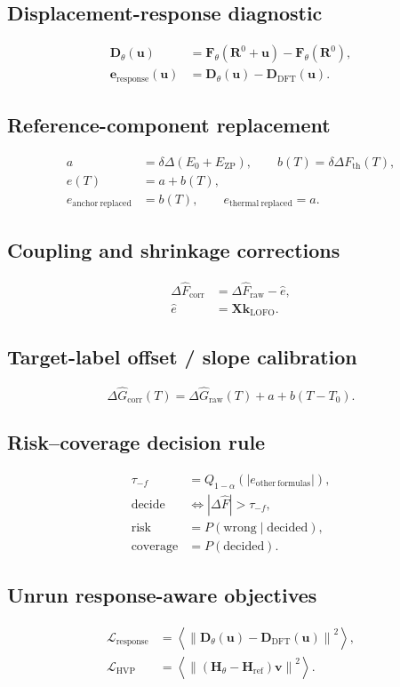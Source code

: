 \documentclass{article}
\begin{document}
\subsection*{Displacement-response diagnostic}
\[\begin{aligned}\mathbf D_\theta(\mathbf u)&=\mathbf F_\theta(\mathbf R^0+\mathbf u)-\mathbf F_\theta(\mathbf R^0),\\\mathbf e_{\mathrm{response}}(\mathbf u)&=\mathbf D_\theta(\mathbf u)-\mathbf D_{\mathrm{DFT}}(\mathbf u).\end{aligned}\]
\subsection*{Reference-component replacement}
\[\begin{aligned}a&=\delta\Delta(E_0+E_{\mathrm{ZP}}),\qquad b(T)=\delta\Delta F_{\mathrm{th}}(T),\\e(T)&=a+b(T),\\e_{\mathrm{anchor\ replaced}}&=b(T),\qquad e_{\mathrm{thermal\ replaced}}=a.\end{aligned}\]
\subsection*{Coupling and shrinkage corrections}
\[\begin{aligned}\Delta\widehat F_{\mathrm{corr}}&=\Delta\widehat F_{\mathrm{raw}}-\widehat e,\\\widehat e&=\mathbf X\mathbf k_{\mathrm{LOFO}}.\end{aligned}\]
\subsection*{Target-label offset / slope calibration}
\[\Delta\widehat G_{\mathrm{corr}}(T)=\Delta\widehat G_{\mathrm{raw}}(T)+a+b(T-T_0).\]
\subsection*{Risk–coverage decision rule}
\[\begin{aligned}\tau_{-f}&=Q_{1-\alpha}\!\left(|e_{\mathrm{other\ formulas}}|\right),\\\text{decide}&\iff |\Delta\widehat F|>\tau_{-f},\\\mathrm{risk}&=P(\mathrm{wrong}\mid\mathrm{decided}),\\\mathrm{coverage}&=P(\mathrm{decided}).\end{aligned}\]
\subsection*{Unrun response-aware objectives}
\[\begin{aligned}\mathcal L_{\mathrm{response}}&=\left\langle\left\lVert\mathbf D_\theta(\mathbf u)-\mathbf D_{\mathrm{DFT}}(\mathbf u)\right\rVert^2\right\rangle,\\\mathcal L_{\mathrm{HVP}}&=\left\langle\left\lVert(\mathbf H_\theta-\mathbf H_{\mathrm{ref}})\mathbf v\right\rVert^2\right\rangle.\end{aligned}\]
\end{document}
